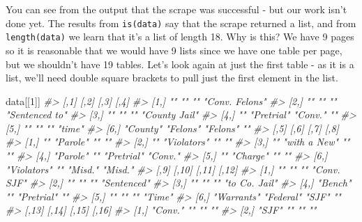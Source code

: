\documentclass[
]{krantz}
\makeatletter
\newenvironment{Shaded}{\begin{snugshade}}{\end{snugshade}}
\newcommand{\CommentTok}[1]{\textcolor[rgb]{0.37,0.37,0.37}{\textit{#1}}}
\newcommand{\DecValTok}[1]{\textcolor[rgb]{0.06,0.06,0.06}{#1}}
\newcommand{\NormalTok}[1]{#1}
\newenvironment{kframe}{%
\medskip{}
\setlength{\fboxsep}{.8em}
 \def\at@end@of@kframe{}%
 \ifinner\ifhmode%
  \def\at@end@of@kframe{\end{minipage}}%
  \begin{minipage}{\columnwidth}%
 \fi\fi%
 \def\FrameCommand##1{\hskip\@totalleftmargin \hskip-\fboxsep
 \colorbox{shadecolor}{##1}\hskip-\fboxsep
     \hskip-\linewidth \hskip-\@totalleftmargin \hskip\columnwidth}%
 \MakeFramed {\advance\hsize-\width
   \@totalleftmargin\z@ \linewidth\hsize
   \@setminipage}}%
 {\par\unskip\endMakeFramed%
 \at@end@of@kframe}
\renewenvironment{Shaded}{\begin{kframe}}{\end{kframe}}
\makeatother
\begin{document}
You can see from the output that the scrape was successful - but our work isn't done yet. The results from \texttt{is(data)} say that the scrape returned a list, and from \texttt{length(data)} we learn that it's a list of length 18. Why is this? We have 9 pages so it is reasonable that we would have 9 lists since we have one table per page, but we shouldn't have 19 tables. Let's look again at just the first table - as it is a list, we'll need double square brackets to pull just the first element in the list.

\begin{Shaded}
\begin{Highlighting}[]
\NormalTok{data[[}\DecValTok{1}\NormalTok{]]}
\CommentTok{\#\textgreater{}      [,1]     [,2]       [,3]     [,4]          }
\CommentTok{\#\textgreater{} [1,] ""       ""         ""       "Conv. Felons"}
\CommentTok{\#\textgreater{} [2,] ""       ""         ""       "Sentenced to"}
\CommentTok{\#\textgreater{} [3,] ""       ""         ""       "County Jail" }
\CommentTok{\#\textgreater{} [4,] ""       "Pretrial" "Conv."  ""            }
\CommentTok{\#\textgreater{} [5,] ""       ""         ""       "time"        }
\CommentTok{\#\textgreater{} [6,] "County" "Felons"   "Felons" ""            }
\CommentTok{\#\textgreater{}      [,5]        [,6]         [,7]       [,8]   }
\CommentTok{\#\textgreater{} [1,] ""          "Parole"     ""         ""     }
\CommentTok{\#\textgreater{} [2,] ""          "Violators"  ""         ""     }
\CommentTok{\#\textgreater{} [3,] ""          "with a New" ""         ""     }
\CommentTok{\#\textgreater{} [4,] "Parole"    ""           "Pretrial" "Conv."}
\CommentTok{\#\textgreater{} [5,] ""          "Charge"     ""         ""     }
\CommentTok{\#\textgreater{} [6,] "Violators" ""           "Misd."    "Misd."}
\CommentTok{\#\textgreater{}      [,9]       [,10]     [,11]      [,12]        }
\CommentTok{\#\textgreater{} [1,] ""         ""        ""         "Conv. SJF"  }
\CommentTok{\#\textgreater{} [2,] ""         ""        ""         "Sentenced"  }
\CommentTok{\#\textgreater{} [3,] ""         ""        ""         "to Co. Jail"}
\CommentTok{\#\textgreater{} [4,] "Bench"    ""        "Pretrial" ""           }
\CommentTok{\#\textgreater{} [5,] ""         ""        ""         "Time"       }
\CommentTok{\#\textgreater{} [6,] "Warrants" "Federal" "SJF"      ""           }
\CommentTok{\#\textgreater{}      [,13]           [,14]    [,15]   [,16]     }
\CommentTok{\#\textgreater{} [1,] "Conv."         ""       ""      ""        }
\CommentTok{\#\textgreater{} [2,] "SJF"           ""       ""      ""        }

\end{Highlighting}
\end{Shaded}
\end{document}
